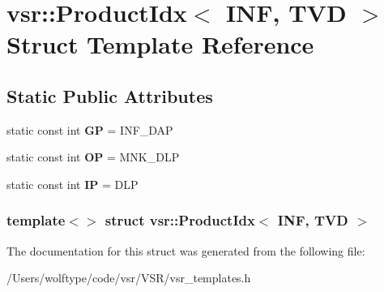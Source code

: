 \hypertarget{structvsr_1_1_product_idx_3_01_i_n_f_00_01_t_v_d_01_4}{\section{vsr\-:\-:Product\-Idx$<$ I\-N\-F, T\-V\-D $>$ Struct Template Reference}
\label{structvsr_1_1_product_idx_3_01_i_n_f_00_01_t_v_d_01_4}
}
\subsection*{Static Public Attributes}
\begin{DoxyCompactItemize}
\item 
\hypertarget{structvsr_1_1_product_idx_3_01_i_n_f_00_01_t_v_d_01_4_ae25bb01ebcf83b2a595f625691100fca}{static const int {\bfseries G\-P} = I\-N\-F\-\_\-\-D\-A\-P}\label{structvsr_1_1_product_idx_3_01_i_n_f_00_01_t_v_d_01_4_ae25bb01ebcf83b2a595f625691100fca}

\item 
\hypertarget{structvsr_1_1_product_idx_3_01_i_n_f_00_01_t_v_d_01_4_a0c7b5f2affd68b5aeb743c6445ee820e}{static const int {\bfseries O\-P} = M\-N\-K\-\_\-\-D\-L\-P}\label{structvsr_1_1_product_idx_3_01_i_n_f_00_01_t_v_d_01_4_a0c7b5f2affd68b5aeb743c6445ee820e}

\item 
\hypertarget{structvsr_1_1_product_idx_3_01_i_n_f_00_01_t_v_d_01_4_a4516104c32a0030f9a487eabc13bd9b6}{static const int {\bfseries I\-P} = D\-L\-P}\label{structvsr_1_1_product_idx_3_01_i_n_f_00_01_t_v_d_01_4_a4516104c32a0030f9a487eabc13bd9b6}

\end{DoxyCompactItemize}
\subsubsection*{template$<$$>$ struct vsr\-::\-Product\-Idx$<$ I\-N\-F, T\-V\-D $>$}



The documentation for this struct was generated from the following file\-:\begin{DoxyCompactItemize}
\item 
/\-Users/wolftype/code/vsr/\-V\-S\-R/vsr\-\_\-templates.\-h\end{DoxyCompactItemize}

